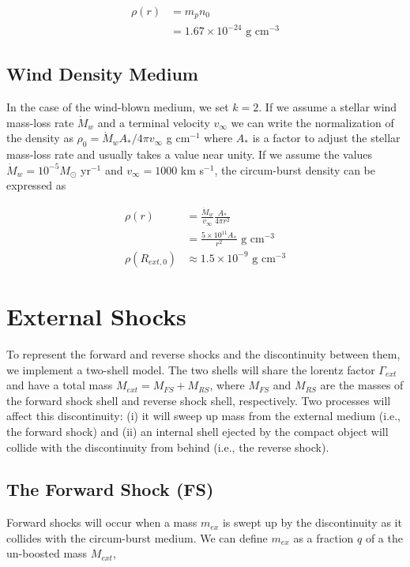 \documentclass[linenumbers,twocolumn]{aastex631}
\begin{document}
\begin{align}
	\rho(r) &= m_pn_0\\
	&= 1.67\times10^{-24} \text{ g cm}^{-3}
\end{align}

\subsection{Wind Density Medium}

In the case of the wind-blown medium, we set $k=2$. If we assume a stellar wind mass-loss rate $\dot{M}_w$ and a terminal velocity $v_{\infty}$ we can write the normalization of the density as $\rho_{0} =  \dot{M}_w A_{*} / 4\pi v_{\infty}$ g cm$^{-1}$ where $A_{*}$ is a factor to adjust the stellar mass-loss rate and usually takes a value near unity. If we assume the values $\dot{M}_w = 10^{-5} M_{\odot}$ yr$^{-1}$ and $v_{\infty} = 1000$ km s$^{-1}$, the circum-burst density can be expressed as

\begin{align}
	\rho(r) &= \frac{\dot{M}_{w}}{v_{\infty}}\frac{A_{*}}{4\pi r^2}\\
	&= \frac{5\times10^{11} A_{*}}{r^2} \text{ g cm}^{-3} \\
	\rho(R_{ext,0}) &\approx 1.5\times10^{-9}\text{ g cm}^{-3}
\end{align}

\section{External Shocks}

To represent the forward and reverse shocks and the discontinuity between them, we implement a two-shell model. The two shells will share the lorentz factor $\Gamma_{ext}$ and have a total mass $M_{ext} = M_{FS} + M_{RS}$, where $M_{FS}$ and $M_{RS}$ are the masses of the forward shock shell and reverse shock shell, respectively. Two processes will affect this discontinuity: (i) it will sweep up mass from the external medium (i.e., the forward shock) and (ii) an internal shell ejected by the compact object will collide with the discontinuity from behind (i.e., the reverse shock).

\subsection{The Forward Shock (FS)}

Forward shocks will occur when a mass $m_{ex}$ is swept up by the discontinuity as it collides with the circum-burst medium. We can define $m_{ex}$ as a fraction $q$ of a the un-boosted mass $M_{ext}$, 
\end{document}
